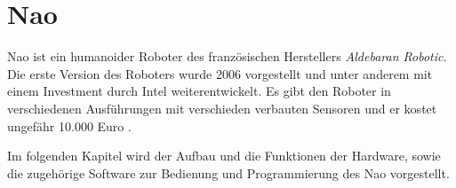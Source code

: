 \chapter{Nao}\label{c:nao}
Nao ist ein humanoider Roboter des französischen Herstellers \textit{Aldebaran Robotic}. Die erste Version des Roboters wurde 2006 vorgestellt und unter anderem mit einem Investment durch Intel weiterentwickelt. Es gibt den Roboter in verschiedenen Ausführungen mit verschieden verbauten Sensoren und er kostet ungefähr 10.000 Euro \cite{ws:wikinao}.

Im folgenden Kapitel wird der Aufbau und die Funktionen der Hardware, sowie die zugehörige Software zur Bedienung und Programmierung des Nao vorgestellt.




